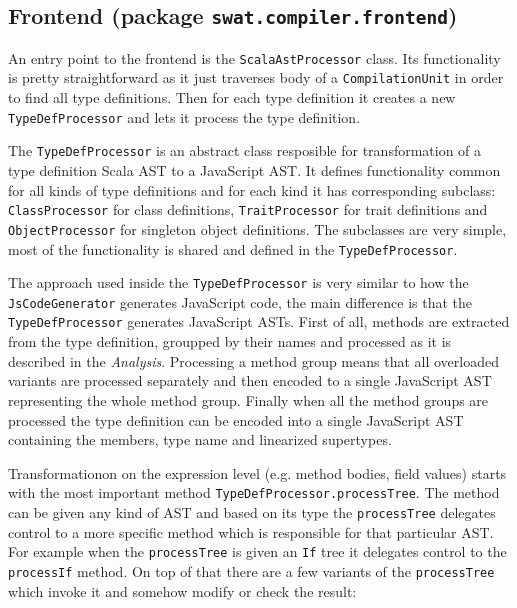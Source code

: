 \documentclass[12pt,a4paper]{report}
\begin{document}
\subsection{Frontend (package \texttt{swat.compiler.frontend})}

An entry point to the frontend is the \texttt{ScalaAstProcessor} class. Its functionality is pretty straightforward as it just traverses body of a \texttt{CompilationUnit} in order to find all type definitions. Then for each type definition it creates a new \texttt{TypeDefProcessor} and lets it process the type definition.

The \texttt{TypeDefProcessor} is an abstract class resposible for transformation of a type definition Scala AST to a JavaScript AST. It defines functionality common for all kinds of type definitions and for each kind it has corresponding subclass: \texttt{ClassProcessor} for class definitions, \texttt{TraitProcessor} for trait definitions and \texttt{ObjectProcessor} for singleton object definitions. The subclasses are very simple, most of the functionality is shared and defined in the \texttt{TypeDefProcessor}.

The approach used inside the \texttt{TypeDefProcessor} is very similar to how the \texttt{JsCodeGenerator} generates JavaScript code, the main difference is that the \texttt{TypeDefProcessor} generates JavaScript ASTs. First of all, methods are extracted from the type definition, groupped by their names and processed as it is described in the {\it Analysis}. Processing a method group means that all overloaded variants are processed separately and then encoded to a single JavaScript AST representing the whole method group. Finally when all the method groups are processed the type definition can be encoded into a single JavaScript AST containing the members, type name and linearized supertypes.

Transformationon on the expression level (e.g. method bodies, field values) starts with the most important method \texttt{TypeDefProcessor.processTree}. The method can be given any kind of AST and based on its type the \texttt{processTree} delegates control to a more specific method which is responsible for that particular AST. For example when the \texttt{processTree} is given an \texttt{If} tree it delegates control to the \texttt{processIf} method. On top of that there are a few variants of the \texttt{processTree} which invoke it and somehow modify or check the result: 
\end{document}
